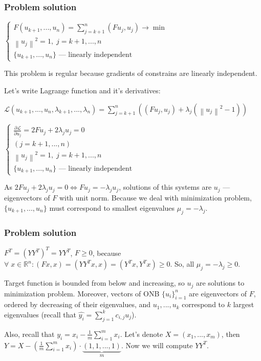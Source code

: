 \documentclass[10pt,pdf]{beamer}
\newcommand{\norm}[1]{\left\lVert#1\right\rVert}
\newcommand{\dotprod}[2]{\left(#1, #2\right)}
\begin{document}
    \begin{frame}
        \frametitle{Problem solution}
        $\begin{cases}
            F(u_{k+1}, ..., u_{n}) = \sum\limits_{j = k+1}^n \dotprod{F u_j}{u_j} \to \min \\
            \norm{u_j}^2 = 1, \; j = k+1, ..., n \\
            \{ u_{k+1}, ..., u_n\} \text{ --- linearly independent}
        \end{cases}$

        This problem is regular because gradients of constrains are linearly independent.

        Let's write Lagrange function and it's derivatives:

        $\mathcal{L}(u_{k+1}, ..., u_{n}, \lambda_{k+1}, ..., \lambda_n) = 
        \sum\limits_{j=k+1}^n\left(\dotprod{F{u_j}}{{u_j}} + 
        \lambda_j\left(\norm{{u_j}
        }^2 - 1\right)\right)$

        $
        \begin{cases}
            \frac{\partial \mathcal{L}}{\partial {u_j}} = 2F{u_j} + 2 \lambda_j {u_j} = 0 \\ 
            (j = k+1, ..., n) \\
            \norm{u_j}^2 = 1, \; j = k+1, ..., n \\
            \{ u_{k+1}, ..., u_n\} \text{ --- linearly independent}
        \end{cases}
        $

        As $2F{u_j} + 2 \lambda_j {u_j} = 0 \Leftrightarrow F{u_j} = -\lambda_j {u_j}$,
        solutions of this systems are $u_j$ --- eigenvectors of $F$ with unit norm.
        Because we deal with minimization problem, $\{ u_{k+1}, ..., u_n\}$
        must correspond to smallest eigenvalues $\mu_j = -\lambda_j$.
    \end{frame}
    \begin{frame}
        \frametitle{Problem solution}
        $F^T = (Y Y^T)^T = Y Y^T$, $F \geq 0$, because $\forall \; x \in \mathbb{R}^n : (Fx, x) = (Y Y^T x, x) = (Y^T x, Y^T x) \geq 0$.
        So, all $\mu_j = -\lambda_j \geq 0$.

        Target function is bounded from below and increasing, so $u_j$ are solutions to minimization problem.
        Moreover, vectors of ONB $\{{u_i}\}_{i=1}^n$ are eigenvectors of $F$, ordered by decreasing of their eigenvalues, and
        $u_1, ..., u_k$ correspond to $k$ largest eigenvalues (recall that $\hat{y_i} = \sum\limits_{j=1}^kc_{i, j}u_j$).
        
        Also, recall that $y_i = x_i - \frac{1}{m} \sum\limits_{i=1}^m x_i$. 
        Let's denote $X = ({x_1}, ..., {x_m})$, then 
        $Y = X - \left( \frac{1}{m} \sum\limits_{i=1}^m x_i\right) \cdot \underbrace{(1, 1, ..., 1)}_{m}$.
        Now we will compute $Y Y^T$.
    \end{frame}
\end{document}
